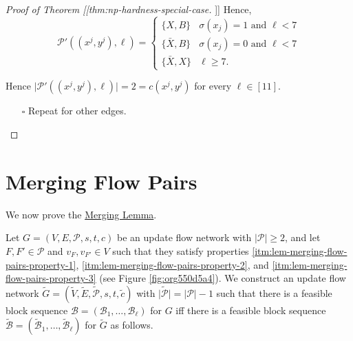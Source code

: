 \documentclass[fontsize=11pt,paper=a4]{book}
\begin{document}
\begin{proof}[Proof of Theorem [[thm:np-hardness-special-case]]]
Hence,
\[\mathcal{P}'((x^j,y^j),\ell)=
\begin{cases}
\{X,B\} & \sigma(x_j)=1\text{ and }\ell<7\\
\{\bar{X},B\} & \sigma(x_j)=0\text{ and }\ell<7\\
\{\bar{X},X\} & \ell\geq 7.
\end{cases}\]

Hence \(\lvert\mathcal{P}'((x^j,y^j),\ell)\rvert=2=c(x^j,y^j)\) for every \(\ell\in[11]\).

\begin{itemize}
\item[{$\square$}] Repeat for other edges.
\end{itemize}
\end{proof}

\chapter{Merging Flow Pairs}
\label{sec:orgccc1bb4}

We now prove the \hyperref[org7dbdd46]{Merging Lemma}.

Let \(G=(V,E,\mathcal{P},s,t,c)\) be an update flow network with \(\lvert\mathcal{P}\rvert\geq 2\), and let \(F,F'\in\mathcal{P}\) and \(v_F,v_{F'}\in V\) such that they satisfy properties \ref{itm:lem-merging-flow-pairs-property-1}, \ref{itm:lem-merging-flow-pairs-property-2}, and \ref{itm:lem-merging-flow-pairs-property-3} (see Figure \ref{fig:org550d5a4}).
We construct an update flow network \(\tilde{G}=(\tilde{V},\tilde{E},\tilde{\mathcal{P}},s,t,\tilde{c})\) with \(\lvert\tilde{\mathcal{P}}\rvert=\lvert\mathcal{P}\rvert-1\) such that there is a feasible block sequence \(\mathcal{B}=(\mathscr{B}_1,\dots,\mathscr{B}_{\ell})\) for \(G\) iff there is a feasible block sequence \(\tilde{\mathcal{B}}=(\tilde{\mathscr{B}}_1,\dots,\tilde{\mathscr{B}}_{\ell})\) for \(\tilde{G}\) as follows.
\end{document}
